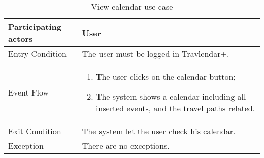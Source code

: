 \begin{table}[H]
	\begin{center}
		\begin{tabular}{ | p{} | p{} | }
		\hline
		Participating actors & User\\
		\hline
		Entry Condition & The user must be logged in Travlendar+.\\
		\hline
		Event Flow & 
			\begin{enumerate}
				\item The user clicks on the calendar button;
				\item The system shows a calendar including all inserted events, and the travel paths related.
			\end{enumerate} \\
		\hline
		Exit Condition & The system let the user check his calendar. \\
		\hline
		Exception & There are no exceptions.\\ 
		\hline
		\end{tabular}
	\end{center}
	\caption{View calendar use-case}
\end{table}